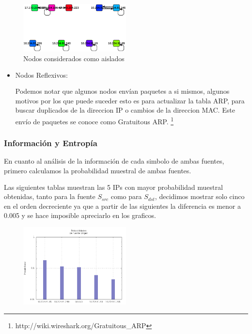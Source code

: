\begin{figure}[H]
		\centering
		\includegraphics[width=0.5\textwidth]{img/graph/escenario_3/nodos_aislados.eps}
		\caption{Nodos considerados como aislados}
		\label{fig:aislados_escenario3}
\end{figure}


\begin{itemize}
\item Nodos Reflexivos:
\par Podemos notar que algunos nodos envían paquetes a si mismos, algunos motivos por los que puede suceder esto es para actualizar la tabla ARP, para buscar duplicados de la direccion IP o cambios de la direccion MAC. Este envío de paquetes se conoce como Gratuitous ARP.  \footnote{http://wiki.wireshark.org/Gratuitous\_ARP}
\end{itemize}

\subsubsection{Informaci\'on y Entrop\'ia}
		        
	\par En cuanto al análisis de la información de cada simbolo de ambas fuentes, primero calculamos la probabilidad muestral de ambas fuentes.
	\par Las siguientes tablas muestran las 5 IPs con mayor probabilidad muestral obtenidas, tanto para la fuente $S_{src}$ como para $S_{dst}$, decidimos mostrar solo cinco en el orden decreciente ya que a partir de las siguientes la diferencia es menor a 0.005 y se hace imposible apreciarlo en los graficos.

\newpage

\begin{figure}[!ht]
    \centering
    \includegraphics[width=0.5\textwidth]{img/graph/escenario_3/proba_src.png}
\end{figure}


